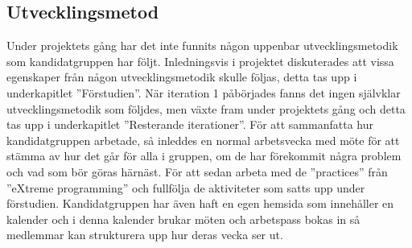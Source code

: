 \subsection{Utvecklingsmetod}
Under projektets gång har det inte funnits någon uppenbar utvecklingsmetodik som kandidatgruppen har följt. Inledningsvis i projektet diskuterades att vissa egenskaper från någon utvecklingsmetodik skulle följas, detta tas upp i underkapitlet ''Förstudien''. När iteration 1 påbörjades fanns det ingen självklar utvecklingsmetodik som följdes, men växte fram under projektets gång och detta tas upp i underkapitlet ''Resterande iterationer''.
\newline
\newline
För att sammanfatta hur kandidatgruppen arbetade, så  inleddes en normal arbetsvecka med möte för att stämma av hur det går för alla i gruppen, om de har förekommit några problem och vad som bör göras härnäst. För att sedan arbeta med de ''practices'' från ''eXtreme programming'' och fullfölja de aktiviteter som satts upp under förstudien. 
\newline
\newline%
Kandidatgruppen har även haft en egen hemsida som innehåller en kalender och i denna kalender brukar möten och arbetspass bokas in så medlemmar kan strukturera upp hur deras vecka ser ut.


